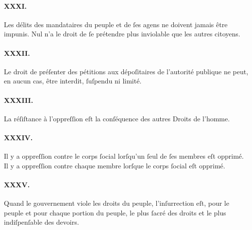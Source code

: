 \documentclass[10pt, twoside]{lecturenotes}
\begin{document}
\paragraph*{XXXI.}Les délits des mandataires du peuple et de ſes agens ne doivent jamais être impunis. Nul n'a le droit de ſe prétendre plus inviolable que les autres citoyens.
\paragraph*{XXXII.}Le droit de préſenter des pétitions aux dépoſitaires de l'autorité publique ne peut, en aucun cas, être interdit, ſuſpendu ni limité.
\paragraph*{XXXIII.}La réſiſtance à l'oppreſſion eſt la conſéquence des autres Droits de l'homme.
\paragraph*{XXXIV.}Il y a oppreſſion contre le corps ſocial lorſqu'un ſeul de ſes membres eſt opprimé. Il y a oppreſſion contre chaque membre lorſque le corps ſocial eſt opprimé.
\paragraph*{XXXV.}Quand le gouvernement viole les droits du peuple, l'inſurrection eſt, pour le peuple et pour chaque portion du peuple, le plus ſacré des droits et le plus indiſpenſable des devoirs.

\newpage
\end{document}
